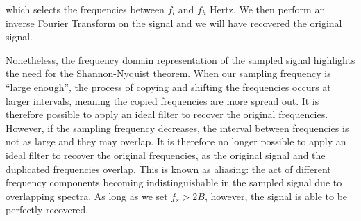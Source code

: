 \documentclass{article}
\begin{document}
which selects the frequencies between $f_l$ and $f_h$ Hertz. %
We then perform an inverse Fourier Transform on the signal and we will have recovered the original signal. %

Nonetheless, the frequency domain representation of the sampled signal highlights the need for the Shannon-Nyquist theorem. %
When our sampling frequency is ``large enough'', the process of copying and shifting the frequencies occurs at larger intervals, meaning the copied frequencies are more spread out. It is therefore possible to apply an ideal filter to recover the original frequencies. %
However, if the sampling frequency decreases, the interval between frequencies is not as large and they may overlap. It is therefore no longer possible to apply an ideal filter to recover the original frequencies, as the original signal and the duplicated frequencies overlap.
This is known as aliasing: the act of different frequency components becoming indistinguishable in the sampled signal due to overlapping spectra. %
As long as we set $f_s > 2B$, however, the signal is able to be perfectly recovered. 


\end{document}
